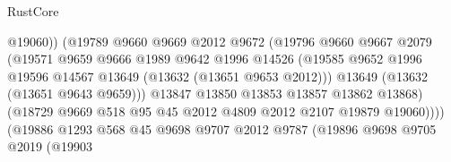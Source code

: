 \begin{lexlean}{RustCore}
\begin{coremodule}
                                        @19060))
                                    (@19789
                                      @9660
                                      @9669
                                      @2012
                                      @9672
                                      (@19796
                                        @9660
                                        @9667
                                        @2079
                                        (@19571
                                          @9659
                                          @9666
                                          @1989
                                          @9642
                                          @1996
                                          @14526
                                          (@19585
                                            @9652
                                            @1996
                                            @19596
                                            @14567
                                            @13649
                                            (@13632 (@13651 @9653 @2012)))
                                          @13649
                                          (@13632 (@13651 @9643 @9659)))
                                        @13847
                                        @13850
                                        @13853
                                        @13857
                                        @13862
                                        @13868)
                                      (@18729
                                        @9669
                                        @518
                                        @95
                                        @45
                                        @2012
                                        @4809
                                        @2012
                                        @2107
                                        @19879
                                        @19060))))
                                (@19886
                                  @1293
                                  @568
                                  @45
                                  @9698
                                  @9707
                                  @2012
                                  @9787
                                  (@19896
                                    @9698
                                    @9705
                                    @2019
                                    (@19903

\end{coremodule}
\end{lexlean}
